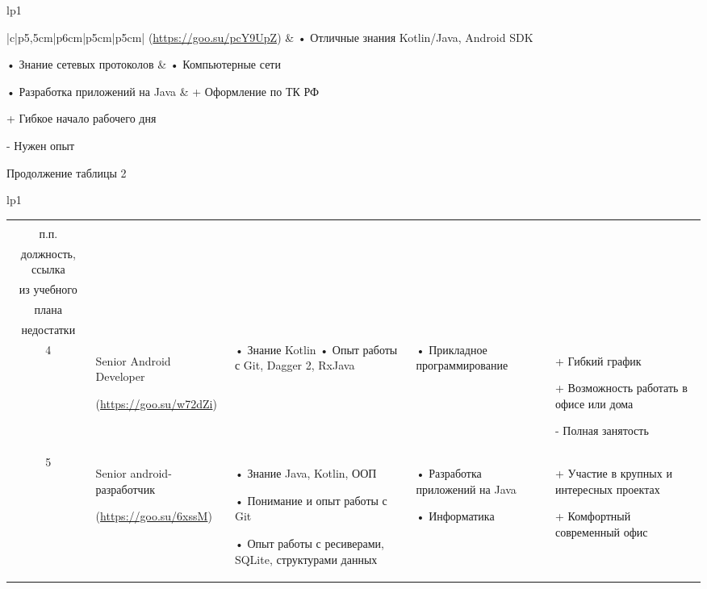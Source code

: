 \documentclass[14pt]{extreport}
\begin{document}
\begin{landscape}
\begin{longtable}[H]{lp{1\linewidth}}
\begin{small}
\begin{tabular}{|c|p{}|p{6cm}|p{5cm}|p{5cm}|}
(\url{https://goo.su/pcY9UpZ}) &
•	Отличные знания Kotlin/Java, Android SDK

•	Знание сетевых протоколов &
•	Компьютерные сети

•	Разработка приложений на Java &
+	Оформление по ТК РФ

+	Гибкое начало рабочего дня 

-	Нужен опыт \\


	\hline


    \end{tabular}
    \end{small}
\end{longtable}




\addtocounter{table}{-1}
\newpage
Продолжение таблицы 2
\begin{longtable}[H]{lp{1\linewidth}}
\caption{Продолжение таблицы 2}

\centering

\begin{small}


    \begin{tabular}{|c|p{}|p{6cm}|p{5cm}|p{5cm}|}
	\hline 
	\makecell{№ \\ п.п.} &	\makecell{Наименование,\\ должность, ссылка} &	\makecell{Требования} & 	\makecell{Дисциплины \\ из учебного \\плана} &	\makecell{Преимущества и \\недостатки}  \\ 
	\hline 
	4	& Senior Android Developer
	
(\url{https://goo.su/w72dZi}) &
•	Знание Kotlin 
•	Опыт работы с Git, Dagger 2, RxJava
& 
•	Прикладное программирование &
+	Гибкий график

+	Возможность работать в офисе или дома

-	Полная занятость \\

	\hline
5	& Senior android-разработчик 

(\url{https://goo.su/6xssM}) &
•	Знание Java, Kotlin, ООП

•	Понимание и опыт работы с Git

•	Опыт работы с ресиверами, SQLite, структурами данных &
•	Разработка приложений на Java

•	Информатика &
+	Участие в крупных и интересных проектах

+	Комфортный современный офис


\end{tabular}
\end{small}
\end{longtable}
\end{landscape}
\end{document}
